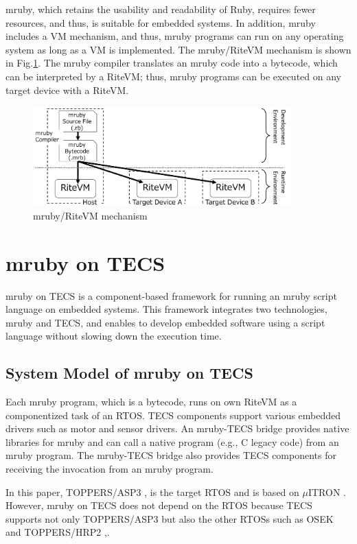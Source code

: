\documentclass[a4j,12pt,oneside,openany,english]{jsbook}
\begin{document}
mruby, which retains the usability and readability of Ruby, requires fewer resources, and thus, is suitable for embedded systems.
In addition, mruby includes a VM mechanism, and thus, mruby programs can run on any operating system as long as a VM is implemented.
The mruby/RiteVM mechanism is shown in Fig.\ref{fig:mruby}.
The mruby compiler translates an mruby code into a bytecode, which can be interpreted by a RiteVM; thus, mruby programs can be executed on any target device with a RiteVM.

\begin{figure}[t]
    \centering
    \includegraphics[width=10cm,clip]{figure/mruby.pdf}
    \caption{mruby/RiteVM mechanism}
    \label{fig:mruby}
\end{figure}


\section{mruby on TECS}
\label{sec:mrubyonTECS}

mruby on TECS is a component-based framework for running an mruby script language on embedded systems.
This framework integrates two technologies, mruby and TECS, and enables to develop embedded software using a script language without slowing down the execution time. 

\subsection{System Model of mruby on TECS}
Each mruby program, which is a bytecode, runs on own RiteVM as a componentized task of an RTOS.
TECS components support various embedded drivers such as motor and sensor drivers.
An mruby-TECS bridge provides native libraries for mruby and can call a native program (e.g., C legacy code) from an mruby program.
The mruby-TECS bridge also provides TECS components for receiving the invocation from an mruby program.

In this paper, TOPPERS/ASP3 \cite{par:ASP3},\cite{url:ASP3} is the target RTOS and is based on $\mu$ITRON \cite{par:microITRON} .
However, mruby on TECS does not depend on the RTOS because TECS supports not only TOPPERS/ASP3 but also the other RTOSs such as OSEK \cite{par:OSEK} and TOPPERS/HRP2 \cite{url:HRP2},\cite{par:hr-tecs}.
\end{document}
